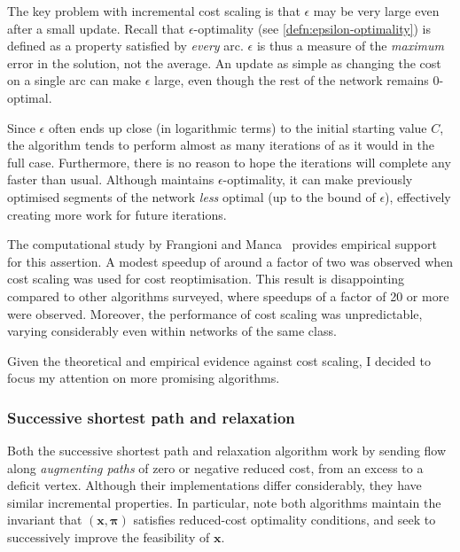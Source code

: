 The key problem with incremental cost scaling is that $\epsilon$ may be very large even after a small update. Recall that $\epsilon$-optimality (see \cref{defn:epsilon-optimality}) is defined as a property satisfied by \emph{every} arc. $\epsilon$ is thus a measure of the \emph{maximum} error in the solution, not the average. An update as simple as changing the cost on a single arc can make $\epsilon$ large, even though the rest of the network remains $0$-optimal.

Since $\epsilon$ often ends up close (in logarithmic terms) to the initial starting value $C$, the algorithm tends to perform almost as many iterations of  as it would in the full case. Furthermore, there is no reason to hope the iterations will complete any faster than usual. Although  maintains $\epsilon$-optimality, it can make previously optimised segments of the network \emph{less} optimal (up to the bound of $\epsilon$), effectively creating more work for future iterations.

The computational study by Frangioni and Manca~\cite{Frangioni:2006} provides empirical support for this assertion. A modest speedup of around a factor of two was observed when cost scaling was used for cost reoptimisation. This result is disappointing compared to other algorithms surveyed, where speedups of a factor of 20 or more were observed. Moreover, the performance of cost scaling was unpredictable, varying considerably even within networks of the same class.

Given the theoretical and empirical evidence against cost scaling, I decided to focus my attention on more promising algorithms.

\subsubsection{Successive shortest path and relaxation}

Both the successive shortest path and relaxation algorithm work by sending flow along \emph{augmenting paths} of zero or negative reduced cost, from an excess to a deficit vertex. Although their implementations differ considerably, they have similar incremental properties. In particular, note both algorithms maintain the invariant that $\left(\mathbf{x},\boldsymbol{\pi}\right)$ satisfies reduced-cost optimality conditions, and seek to successively improve the feasibility of $\mathbf{x}$\footnotemark.

